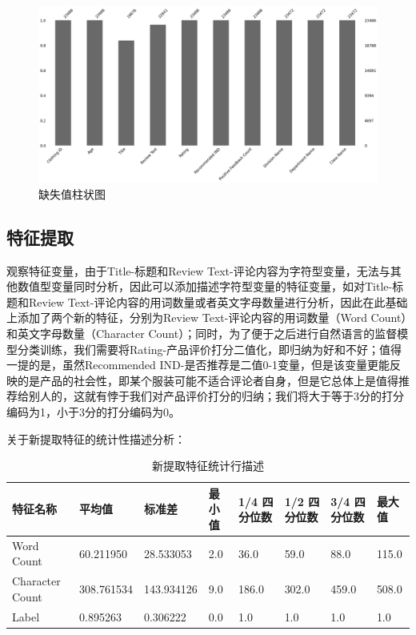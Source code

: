 \documentclass[
  journal=medium,
  manuscript=article-type,
  year=2023,
  volume=37,
]{cup-journal}
\begin{document}
\begin{figure}[hbt!]
    \centering
    \includegraphics[width=1.0\linewidth]{缺失值柱状图.png}
    \caption{缺失值柱状图}
    \label{fig_missing_bar}
\end{figure}



\subsection{特征提取} 

观察特征变量，由于Title-标题和Review Text-评论内容为字符型变量，无法与其他数值型变量同时分析，因此可以添加描述字符型变量的特征变量，如对Title-标题和Review Text-评论内容的用词数量或者英文字母数量进行分析，因此在此基础上添加了两个新的特征，分别为Review Text-评论内容的用词数量（Word Count）和英文字母数量（Character Count）；同时，为了便于之后进行自然语言的监督模型分类训练，我们需要将Rating-产品评价打分二值化，即归纳为好和不好；值得一提的是，虽然Recommended IND-是否推荐是二值0-1变量，但是该变量更能反映的是产品的社会性，即某个服装可能不适合评论者自身，但是它总体上是值得推荐给别人的，这就有悖于我们对产品评价打分的归纳；我们将大于等于3分的打分编码为1，小于3分的打分编码为0。

关于新提取特征的统计性描述分析：

\begin{table}[hbt!]
    \begin{threeparttable}
    \caption{新提取特征统计行描述}
    \label{table_describe_new}
    \begin{tabular}{llllllll}
    \toprule
    \headrow 特征名称 & 平均值 & 标准差 & 最小值 & 1/4 四分位数 & 1/2 四分位数 & 3/4 四分位数 & 最大值\\
    \midrule
    Word Count & 60.211950 & 28.533053 & 2.0 & 36.0 & 59.0 & 88.0 & 115.0  \\ 
    \midrule
    Character Count & 308.761534 & 143.934126 & 9.0 & 186.0 & 302.0 & 459.0 & 508.0 \\
    \midrule
    Label & 0.895263 & 0.306222 & 0.0 & 1.0 & 1.0 & 1.0 & 1.0  \\
    \bottomrule 
    \end{tabular}
    \end{threeparttable}
\end{table}
\end{document}
